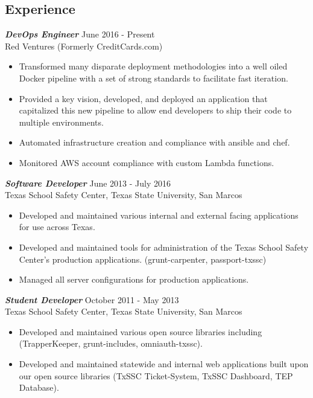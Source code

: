 \documentclass[line,margin]{res}
\begin{document}
\address{\textit{\small{matmcfarland@gmail.com \\ https://github.com/vanetix}}}

\begin{resume}

\section{Experience}
\textit{\textbf{DevOps Engineer}} \hfill June 2016 - Present \\
Red Ventures (Formerly CreditCards.com)
\begin{itemize} \itemsep -2pt
  \item Transformed many disparate deployment methodologies into a well oiled Docker pipeline with a set of strong standards to facilitate fast iteration.
  \item Provided a key vision, developed, and deployed an application that capitalized this new pipeline to allow end developers to ship their code to multiple environments.
  \item Automated infrastructure creation and compliance with ansible and chef.
  \item Monitored AWS account compliance with custom Lambda functions.
\end{itemize}
\textit{\textbf{Software Developer}} \hfill June 2013 - July 2016 \\
Texas School Safety Center, Texas State University, San Marcos
\begin{itemize} \itemsep -2pt
  \item Developed and maintained various internal and external facing applications for use across Texas.
  \item Developed and maintained tools for administration of the Texas School Safety Center's production applications. (grunt-carpenter, passport-txssc)
  \item Managed all server configurations for production applications.
\end{itemize}
\textit{\textbf{Student Developer}} \hfill October 2011 - May 2013 \\
Texas School Safety Center, Texas State University, San Marcos
\begin{itemize} \itemsep -2pt
  \item Developed and maintained various open source libraries including (TrapperKeeper, grunt-includes, omniauth-txssc).
  \item Developed and maintained statewide and internal web applications built upon our open source libraries (TxSSC Ticket-System, TxSSC Dashboard, TEP Database).
\end{itemize}


\end{resume}
\end{document}
